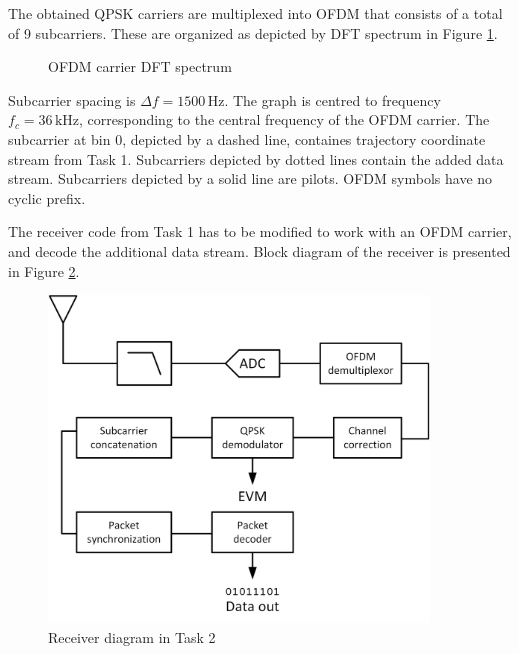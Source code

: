 \documentclass{article}
\begin{document}
The obtained QPSK carriers are multiplexed into OFDM that consists of a total of 9 subcarriers. These are organized as depicted by DFT spectrum in Figure \ref{fig:dft}.
\begin{figure}[h!]
	\centering
	\caption{OFDM carrier DFT spectrum}
	\label{fig:dft}
\end{figure}

Subcarrier spacing is $\varDelta f = 1500 \,\textrm{Hz}$. The graph is centred to frequency $f_c = 36 \,\textrm{kHz}$, corresponding to the central frequency of the OFDM carrier. The subcarrier at bin 0, depicted by a dashed line, containes trajectory coordinate stream from Task 1. Subcarriers depicted by dotted lines contain the added data stream. Subcarriers depicted by a solid line are pilots. OFDM symbols have no cyclic prefix.

The receiver code from Task 1 has to be modified to work with an OFDM carrier, and decode the additional data stream. Block diagram of the receiver is presented in Figure \ref{fig:task2}.

\begin{figure}[h!]
\centering
\includegraphics[width=0.9\textwidth]{Images/Task2.png}
\caption{Receiver diagram in Task 2}
\label{fig:task2}
\end{figure}
\end{document}
